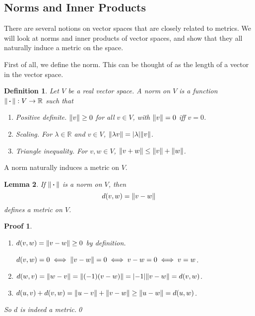 \documentclass{article}
\theoremstyle{plain}\theoremheaderfont{\normalfont\itshape}\theorembodyfont{\rmfamily}\theoremseparator{.}\newtheorem*{rem}{Remark}\newtheorem*{ex}{Example}\newtheorem*{proof}{Proof}\newtheorem*{altp}{Alternative proof}
\theoremstyle{plain}\theoremheaderfont{\normalfont\bfseries}\theorembodyfont{\rmfamily}\theoremseparator{.}\newtheorem{thm}{Theorem}[section]\newtheorem{lem}[thm]{Lemma}\newtheorem{prop}[thm]{Proposition}\newtheorem*{cor}{Corollary}\newtheorem{defn}[thm]{Definition}\newtheorem{clm}[thm]{Claim}\newtheorem{clminproof}{Claim}
\theoremstyle{break}\theoremheaderfont{\normalfont\itshape}\theorembodyfont{\rmfamily}\theoremseparator{.\medskip}\newtheorem*{proofskip}{Proof}\newtheorem*{exs}{Examples}\newtheorem*{rems}{Remarks}
\theoremstyle{break}\theoremheaderfont{\normalfont\bfseries}\theorembodyfont{\rmfamily}\theoremseparator{.\medskip}\newtheorem{lemskip}[thm]{Lemma}\newtheorem{defnskip}[thm]{Definition}\newtheorem{propskip}[thm]{Proposition}\newtheorem{thmskip}[thm]{Theorem}
\newcommand{\qed}{\hfill\ensuremath{\Box}}
\begin{document}
    \subsection{Norms and Inner Products}
    There are several notions on vector spaces that are closely related to metrics. We will look at norms and inner products of vector spaces, and show that they all naturally induce a metric on the space.

    First of all, we define the norm. This can be thought of as the length of a vector in the vector space.

    \begin{defn}
        Let \(V\) be a real vector space. A \textit{norm} on \(V\) is a function \(\norm{\,\vdot\,}:V\to\mathbb{R}\) such that
        \begin{enumerate}[topsep=0pt]
            \item \textit{Positive definite.} \(\norm{v}\ge 0\) for all \(v\in V\), with \(\norm{v}=0\) iff \(v=0\).
            \item \textit{Scaling.} For \(\lambda\in\mathbb{R}\) and \(v\in V\), \(\norm{\lambda v}=\abs{\lambda}\norm{v}\).
            \item \textit{Triangle inequality.} For \(v,w\in V\), \(\norm{v+w}\le\norm{v}+\norm{w}\).
        \end{enumerate}
    \end{defn}

    A norm naturally induces a metric on \(V\).
    \begin{lem}
        If \(\norm{\,\vdot\,}\) is a norm on \(V\), then
        \[d(v,w)=\norm{v-w}\]
        defines a metric on \(V\).
    \end{lem}
    \begin{proofskip}
        \begin{enumerate}[label=(\roman*),topsep=0pt]
            \item \(d(v,w)=\norm{v-w}\ge 0\) by definition.
            
            \(d(v,w)=0\iff\norm{v-w}=0\iff v-w=0\iff v=w\).
            \item \(d(w,v)=\norm{w-v}=\norm{(-1)(v-w)}=\abs{-1}\norm{v-w}=d(v,w)\).
            \item \(d(u,v)+d(v,w)=\norm{u-v}+\norm{v-w}\ge\norm{u-w}=d(u,w)\).
        \end{enumerate}
        So \(d\) is indeed a metric.\qed
    \end{proofskip}
    
\end{document}
